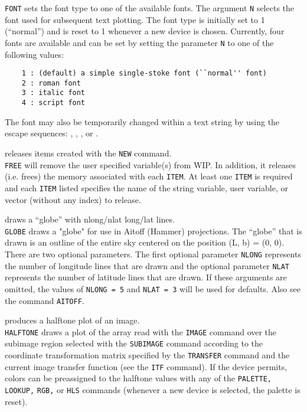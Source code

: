 	{\tt FONT} sets the font type to one of the available fonts.
	The argument {\tt N} selects the font used for subsequent
	text plotting.  The font type is initially set to 1 (``normal'')
	and is reset to 1 whenever a new device is chosen.  Currently,
	four fonts are available and can be set by setting the parameter
	{\tt N} to one of the following values:
	\begin{verbatim}
    1 : (default) a simple single-stoke font (``normal'' font)
    2 : roman font
    3 : italic font
    4 : script font
	\end{verbatim}
	The font may also be temporarily changed within a text string
	by using the escape sequences: , , , or .
\item [{\tt FREE item1 [item2 [\dots]] } --] releases items created with the {\tt NEW} command.\\
	{\tt FREE} will remove the user specified variable(s) from
	WIP.  In addition, it releases (i.e. frees) the memory associated
	with each {\tt ITEM}.  At least one {\tt ITEM} is
	required and each {\tt ITEM} listed specifies the name of
	the string variable, user variable, or vector (without any index)
	to release.
\item [{\tt GLOBE [nlong nlat] } --] draws a ``globe'' with nlong/nlat long/lat lines.\\
	{\tt GLOBE} draws a "globe" for use in Aitoff (Hammer)
	projections.  The ``globe'' that is drawn is an outline of the
	entire sky centered on the position (L, b) = (0, 0).  There
	are two optional parameters.  The first optional parameter
	{\tt NLONG} represents the number of longitude lines
	that are drawn and the optional parameter {\tt NLAT}
	represents the number of latitude lines that are drawn.  If
	these arguments are omitted, the values of {\tt NLONG = 5}
	and {\tt NLAT = 3} will be used for defaults.
	Also see the command {\tt AITOFF}.
\item [{\tt HALFTONE [MIN MAX [N [BLANK]]] } --] produces a halftone plot of an image.\\
	{\tt HALFTONE} draws a plot of the array read with the
	{\tt IMAGE} command over the subimage
	region selected with the {\tt SUBIMAGE}
	command according to the coordinate transformation matrix
	specified by the {\tt TRANSFER}
	command and the current image transfer function (see the
	{\tt ITF} command).
	If the device permits, colors
	can be preassigned to the halftone values with any of the
	{\tt PALETTE,}
	{\tt LOOKUP,}
	{\tt RGB,} or
	{\tt HLS} commands
	(whenever a new device is selected, the palette is reset).
